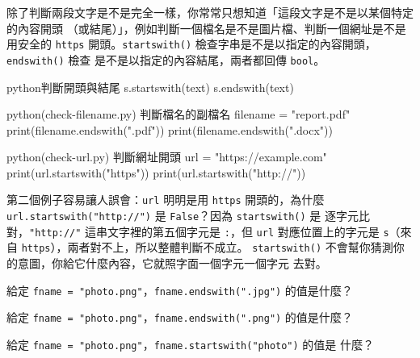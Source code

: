 除了判斷兩段文字是不是完全一樣，你常常只想知道「這段文字是不是以某個特定的內容開頭
（或結尾）」，例如判斷一個檔名是不是圖片檔、判斷一個網址是不是用安全的 \texttt{https}
開頭。\texttt{startswith()} 檢查字串是不是以指定的內容開頭，
\texttt{endswith()} 檢查
是不是以指定的內容結尾，兩者都回傳 \texttt{bool}。

\begin{code}{python}{判斷開頭與結尾}
s.startswith(text)
s.endswith(text)
\end{code}

\begin{example}{python}{(check-filename.py) 判斷檔名的副檔名}
filename = "report.pdf"
print(filename.endswith(".pdf"))
print(filename.endswith(".docx"))
\end{example}


\begin{example}{python}{(check-url.py) 判斷網址開頭}
url = "https://example.com"
print(url.startswith("https"))
print(url.startswith("http://"))
\end{example}


第二個例子容易讓人誤會：\texttt{url} 明明是用 \texttt{https} 開頭的，為什麼
\texttt{url.startswith("http://")} 是 \texttt{False}？因為 \texttt{startswith()} 是
逐字元比對，\texttt{"http://"} 這串文字裡的第五個字元是 \texttt{:}，但 \texttt{url}
對應位置上的字元是 \texttt{s}（來自 \texttt{https}），兩者對不上，所以整體判斷不成立。
\texttt{startswith()} 不會幫你猜測你的意圖，你給它什麼內容，它就照字面一個字元一個字元
去對。


\begin{drills}[label=drills:startswith-endswith]
\item 給定 \texttt{fname = "photo.png"}，\texttt{fname.endswith(".jpg")} 的值是什麼？
\item 給定 \texttt{fname = "photo.png"}，\texttt{fname.endswith(".png")} 的值是什麼？
\item 給定 \texttt{fname = "photo.png"}，\texttt{fname.startswith("photo")} 的值是
什麼？
\end{drills}

